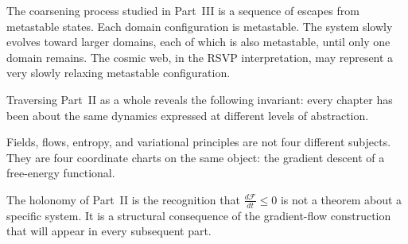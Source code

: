 \begin{TechNote}
  The coarsening process studied in Part~III is a sequence of
  escapes from metastable states.
  Each domain configuration is metastable.
  The system slowly evolves toward larger domains, each of
  which is also metastable, until only one domain remains.
  The cosmic web, in the RSVP interpretation, may represent
  a very slowly relaxing metastable configuration.
\end{TechNote}

\begin{HolonomyNote}
  Traversing Part~II as a whole reveals the following invariant:
  every chapter has been about the same dynamics expressed at
  different levels of abstraction.

  Fields, flows, entropy, and variational principles are not
  four different subjects.
  They are four coordinate charts on the same object:
  the gradient descent of a free-energy functional.

  The holonomy of Part~II is the recognition that
  $\frac{d\mathcal{F}}{dt} \leq 0$ is not a theorem about
  a specific system.
  It is a structural consequence of the gradient-flow
  construction that will appear in every subsequent part.
\end{HolonomyNote}

